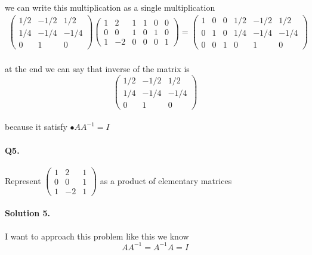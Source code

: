 \documentclass[11pt]{article}
\begin{document}
\paragraph{}we can write this multiplication as a single multiplication
\begin{eqnarray*}
\begin{pmatrix}
1/2 & -1/2 & 1/2\\
1/4 & -1/4 & -1/4\\
0 & 1 & 0
\end{pmatrix}
\left(\begin{array}{ccc|ccc}  
	1 & 2 & 1 & 1 & 0 & 0\\
    0 & 0 & 1 & 0 & 1 & 0\\
    1 & -2 & 0 & 0 & 0 & 1
\end{array}\right)
=
\left(\begin{array}{ccc|ccc}  
	1 & 0 & 0 & 1/2 & -1/2 & 1/2\\
    0 & 1 & 0 & 1/4 & -1/4 & -1/4\\
    0 & 0 & 1 & 0 & 1 & 0
\end{array}\right)
\end{eqnarray*}
\paragraph{}at the end we can say that inverse of the matrix is
\[
\begin{pmatrix}
1/2 & -1/2 & 1/2\\
1/4 & -1/4 & -1/4\\
0 & 1 & 0
\end{pmatrix}
\]
\paragraph{}because it satisfy $\mathbf{•}{A A^{-1}=I}$

\paragraph{Q5.}Represent
$
\begin{pmatrix}
1 & 2 & 1\\
0 & 0 & 1\\
1 & -2 & 1
\end{pmatrix}
$ as a product of elementary matrices
\paragraph{Solution 5.}I want to approach this problem like this we know
\begin{equation*}
AA^{-1}=A^{-1}A=I
\end{equation*}
\end{document}
